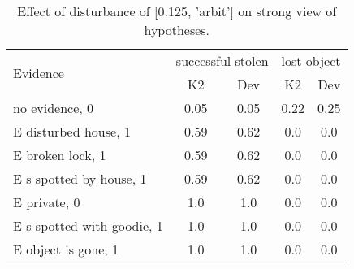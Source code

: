 \begin{table}\begin{tabular}{l|cc|cc}\toprule\multirow{2}{*}{Evidence} & \multicolumn{2}{c}{successful stolen}& \multicolumn{2}{c}{lost object}\\& {K2} & {Dev}& {K2} & {Dev}\\\midrule
no evidence, 0 & 0.05&0.05&0.22&0.25\\E disturbed house, 1 & 0.59&0.62&0.0&0.0\\E broken lock, 1 & 0.59&0.62&0.0&0.0\\E s spotted by house, 1 & 0.59&0.62&0.0&0.0\\E private, 0 & 1.0&1.0&0.0&0.0\\E s spotted with goodie, 1 & 1.0&1.0&0.0&0.0\\E object is gone, 1 & 1.0&1.0&0.0&0.0\\\bottomrule\end{tabular}\caption{Effect of disturbance of [0.125, 'arbit'] on strong view of hypotheses.}\end{table}